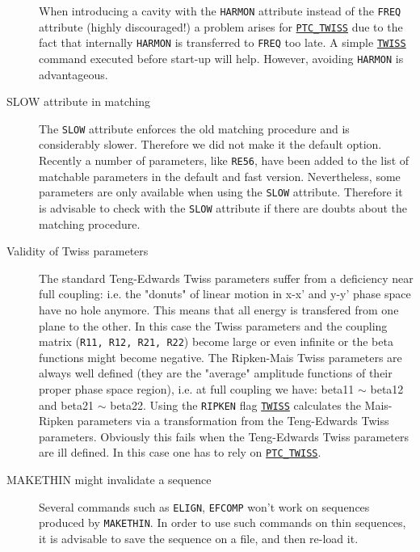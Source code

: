 \begin{description}
  When introducing a cavity with the \texttt{HARMON} attribute instead
  of the \texttt{FREQ} attribute (highly discouraged!) a problem arises
  for  \hyperref[sec:ptc-twiss]{\texttt{PTC\_TWISS}} due to the fact that
  internally \texttt{HARMON} is transferred to \texttt{FREQ} too late. A
  simple \hyperref[chap:twiss]{\texttt{TWISS}} command executed before \ptc
  start-up will help. However, avoiding \texttt{HARMON} is advantageous.
    

\item[SLOW attribute in matching] 
  The \texttt{SLOW} attribute enforces the old matching procedure and is
  considerably slower. Therefore we did not make it the default
  option. Recently a number of parameters, like \texttt{RE56}, have been
  added to the list of matchable parameters in the default and fast
  version. Nevertheless, some parameters are only available when using
  the \texttt{SLOW} attribute. Therefore it is advisable to check with the
  \texttt{SLOW} attribute if there are doubts about the matching procedure.  


\item[Validity of Twiss parameters]
  The standard Teng-Edwards Twiss parameters suffer from a deficiency near
  full coupling: i.e. the "donuts" of linear motion in x-x' and y-y' phase
  space have no hole anymore. This means that all energy is transfered
  from one plane to the other. In this case the Twiss parameters and the
  coupling matrix (\texttt{R11, R12, R21, R22}) become large or even infinite or
  the beta functions might become negative. The Ripken-Mais Twiss
  parameters are always well defined (they are the "average" amplitude
  functions of their proper phase space region), i.e. at full coupling we
  have: beta11 $\sim$ beta12 and beta21 $\sim$ beta22. Using the \texttt{RIPKEN}
  flag \hyperref[chap:twiss]{\texttt{TWISS}} calculates the Mais-Ripken
  parameters via a transformation from the Teng-Edwards Twiss
  parameters. Obviously this fails when the Teng-Edwards Twiss
  parameters are ill defined. In this case one has to rely on
  \hyperref[chap:ptc-twiss]{\texttt{PTC\_TWISS}}.    
  \item[MAKETHIN might invalidate a sequence]
   Several \madx commands such as {\texttt{ELIGN}}, {\texttt{EFCOMP}} won't work on sequences produced by {\texttt{MAKETHIN}}. In order to use such commands on thin sequences, it is advisable to save the sequence on a file, and then re-load it.
   
   
\end{description}

